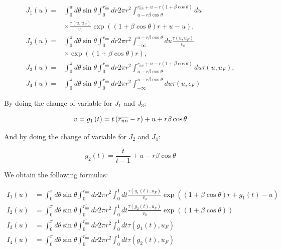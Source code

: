 \begin{equation}
    \begin{aligned}
    J_{1}\left(u\right)=& \int_{0}^{\pi} d \theta \sin \theta \int_{0}^{\overline{r_{n n}}} d r 2 \pi r^{2} \int_{u-r \beta \cos \theta}^{\overline{r_{n n}}+u-r(1+\beta \cos \theta)} d u \\
    & \times \frac{\tau\left(u, u_{F}\right)}{v_{0}} \exp \left((1+\beta \cos \theta) r+u-u\right), \\
    J_{2}\left(u\right)=& \int_{0}^{\pi} d \theta \sin \theta \int_{0}^{\overline{r_{n n}}} d r 2 \pi r^{2} \int_{-\infty}^{u-r \beta \cos \theta} d u \frac{\tau\left(u, u_{F}\right)}{v_{0}} \\
    & \times \exp ((1+\beta \cos \theta) r), \\
    J_{3}\left(u\right)=& \int_{0}^{\pi} d \theta \sin \theta \int_{0}^{\overline{r_{n n}}} d r 2 \pi r^{2} \int_{u-r \beta \cos \theta}^{\overline{r_{n n}}+u-r(1+\beta \cos \theta)} d u \tau\left(u, u_{F}\right), \\
    J_{4}\left(u\right)=& \int_{0}^{\pi} d \theta \sin \theta \int_{0}^{\overline{r_{n n}}} d r 2 \pi r^{2} \int_{-\infty}^{u-r \beta \cos \theta} d u \tau\left(u, \epsilon_{F}\right)
    \end{aligned}
\end{equation}

By doing the change of variable for $J_1$ and $J_3$:

\begin{equation}
    v = g_{1}\left(t\right)=t\left(\overline{r_{n n}}-r\right)+u+r \beta \cos \theta \\
\end{equation}

And by doing the change of variable for $J_2$ and $J_4$:

\begin{equation}
    g_{2}\left(t\right)=\frac{t}{t-1}+u-r \beta \cos \theta
\end{equation}

We obtain the following formulas:

\begin{equation}
    \begin{aligned}
    I_{1}\left(u\right)&=\int_{0}^{\pi} d \theta \sin \theta \int_{0}^{\overline{r_{n n}}} d r 2 \pi r^{2} \int_{0}^{1} d t \frac{\tau\left(g_{1}(t), u_{F}\right)}{v_{0}} \exp \left((1+\beta \cos \theta) r+g_{1}(t)-u\right) \\
    I_{2}\left(u\right)&=\int_{0}^{\pi} d \theta \sin \theta \int_{0}^{\overline{r_{n n}}} d r 2 \pi r^{2} \int_{0}^{1} d t \frac{\tau\left(g_{2}(t), u_{F}\right)}{v_{0}} \exp ((1+\beta \cos \theta)) \\
    I_{3}\left(u\right)&=\int_{0}^{\pi} d \theta \sin \theta \int_{0}^{\overline{r_{n n}}} d r 2 \pi r^{2} \int_{0}^{1} d t \tau\left(g_{1}(t), u_{F}\right) \\
    I_{4}\left(u\right)&=\int_{0}^{\pi} d \theta \sin \theta \int_{0}^{\overline{r_{n n}}} d r 2 \pi r^{2} \int_{0}^{1} d t \tau\left(g_{2}(t), u_{F}\right)
    \end{aligned}
\end{equation}

